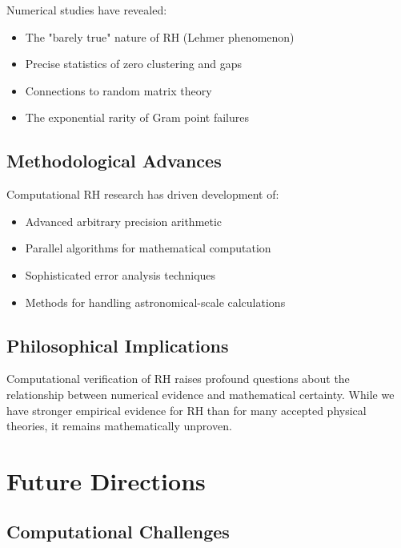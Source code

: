 \begin{theorem}
Numerical studies have revealed:
\begin{itemize}
\item The "barely true" nature of RH (Lehmer phenomenon)
\item Precise statistics of zero clustering and gaps  
\item Connections to random matrix theory
\item The exponential rarity of Gram point failures
\end{itemize}
\end{theorem}

\subsection{Methodological Advances}

Computational RH research has driven development of:
\begin{itemize}
\item Advanced arbitrary precision arithmetic
\item Parallel algorithms for mathematical computation
\item Sophisticated error analysis techniques
\item Methods for handling astronomical-scale calculations
\end{itemize}

\subsection{Philosophical Implications}

\begin{remark}
Computational verification of RH raises profound questions about the relationship between numerical evidence and mathematical certainty. While we have stronger empirical evidence for RH than for many accepted physical theories, it remains mathematically unproven.
\end{remark}

\section{Future Directions}
\label{sec:future-directions}

\subsection{Computational Challenges}


